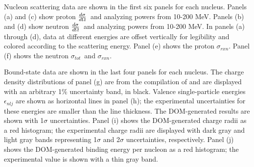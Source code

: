 \documentclass[twocolumn,secnumarabic,amssymb, nobibnotes, aps, prl,
superscriptaddress, nobalancelastpage, draft]{revtex4}
\newcommand{\tot}{\ensuremath{\sigma_{tot}}}
\newcommand{\rxn}{\ensuremath{\sigma_{rxn}}}
\newcommand{\el}{\ensuremath{\frac{\lowercase{d}\sigma}{\lowercase{d}\Omega}}}
\begin{document}
Nucleon scattering data are shown in the first six panels for each nucleus.
Panels (a) and (c) show proton \el\ and analyzing powers from 10-200 MeV.
Panels (b) and (d) show neutron \el\ and analyzing powers from 10-200 MeV.
In panels (a) through (d), data at different energies are offset
vertically for legibility and colored according to the scattering
energy. Panel (e) shows the proton \rxn. Panel (f) shows the
neutron \tot\ and \rxn.

Bound-state data are shown in the last four panels for each nucleus.
The charge density distributions of panel (g) are from the compilation of
\cite{DeVries1987} and are displayed with an arbitrary 1\% uncertainty
band, in black. Valence single-particle energies $\epsilon_{nlj}$ are shown as
horizontal lines in panel (h); the experimental uncertainties for these energies
are smaller than the line thickness. The DOM-generated results are shown with
1$\sigma$ uncertainties. Panel (i) shows the DOM-generated charge radii as a red
histogram; the experimental charge radii are displayed with dark gray and light
gray bands representing 1$\sigma$ and 2$\sigma$ uncertainties, respectively.
Panel (j) shows the DOM-generated binding energy per nucleon as a red
histogram; the experimental value is shown with a thin gray band.
\end{document}

